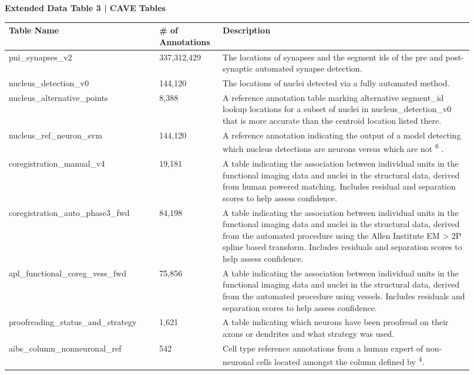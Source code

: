 \documentclass{article}
\begin{document}
\noindent\textbf{Extended Data Table 3 | CAVE Tables}

{\small
\begin{longtable}{p{0.3\linewidth}p{0.12\linewidth}p{0.5\linewidth}}
\toprule
Table Name & \# of Annotations & Description \\
\midrule
pni\_synapses\_v2 & 337,312,429 & The locations of synapses and the segment ids of the pre and post-synaptic automated synapse detection. \\
nucleus\_detection\_v0 & 144,120 & The locations of nuclei detected via a fully automated method. \\
nucleus\_alternative\_points & 8,388 & A reference annotation table marking alternative segment\_id lookup locations for a subset of nuclei in nucleus\_detection\_v0 that is more accurate than the centroid location listed there. \\
nucleus\_ref\_neuron\_svm & 144,120 & A reference annotation indicating the output of a model detecting which nucleus detections are neurons versus which are not \textsuperscript{6} . \\
coregistration\_manual\_v4 & 19,181 & A table indicating the association between individual units in the functional imaging data and nuclei in the structural data, derived from human powered matching. Includes residual and separation scores to help assess confidence. \\
coregistration\_auto\_phase3\_fwd & 84,198 & A table indicating the association between individual units in the functional imaging data and nuclei in the structural data, derived from the automated procedure using the Allen Institute EM \textgreater{} 2P spline based transform. Includes residuals and separation scores to help assess confidence. \\
apl\_functional\_coreg\_vess\_fwd & 75,856 & A table indicating the association between individual units in the functional imaging data and nuclei in the structural data, derived from the automated procedure using vessels. Includes residuals and separation scores to help assess confidence. \\
proofreading\_status\_and\_strategy & 1,621 & A table indicating which neurons have been proofread on their axons or dendrites and what strategy was used. \\
aibs\_column\_nonneuronal\_ref & 542 & Cell type reference annotations from a human expert of non-neuronal cells located amongst the column defined by \textsuperscript{4}. \\

\end{longtable}}
\end{document}
